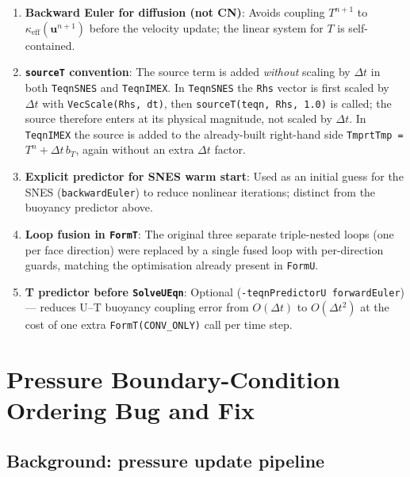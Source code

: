 \documentclass[12pt,a4paper]{article}
\begin{document}
\begin{enumerate}
  \item \textbf{Backward Euler for diffusion (not CN)}: Avoids coupling
        $T^{n+1}$ to $\kappa_{\text{eff}}(\mathbf{u}^{n+1})$ before the
        velocity update; the linear system for $T$ is self-contained.

  \item \textbf{\texttt{sourceT} convention}: The source term is added
        \emph{without} scaling by $\Delta t$ in both \texttt{TeqnSNES} and
        \texttt{TeqnIMEX}.  In \texttt{TeqnSNES} the \texttt{Rhs} vector is
        first scaled by $\Delta t$ with \texttt{VecScale(Rhs, dt)}, then
        \texttt{sourceT(teqn, Rhs, 1.0)} is called; the source therefore
        enters at its physical magnitude, not scaled by $\Delta t$.
        In \texttt{TeqnIMEX} the source is added to the already-built
        right-hand side \texttt{TmprtTmp = $T^n + \Delta t\,b_T$}, again
        without an extra $\Delta t$ factor.

  \item \textbf{Explicit predictor for SNES warm start}: Used as an initial
        guess for the SNES (\texttt{backwardEuler}) to reduce nonlinear
        iterations; distinct from the buoyancy predictor above.

  \item \textbf{Loop fusion in \texttt{FormT}}: The original three separate
        triple-nested loops (one per face direction) were replaced by a single
        fused loop with per-direction guards, matching the optimisation
        already present in \texttt{FormU}.

  \item \textbf{T predictor before \texttt{SolveUEqn}}: Optional
        (\texttt{-teqnPredictorU forwardEuler}) — reduces U--T buoyancy
        coupling error from $O(\Delta t)$ to $O(\Delta t^2)$ at the cost
        of one extra \texttt{FormT(CONV\_ONLY)} call per time step.
\end{enumerate}

\section{Pressure Boundary-Condition Ordering Bug and Fix}
\label{sec:peqn-bc-bug}

\subsection{Background: pressure update pipeline}
\label{sec:peqn-bc-bug-bg}
\end{document}
